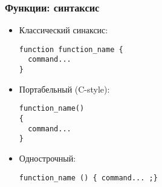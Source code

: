 \begin{frame}[fragile]
	\frametitle{Функции: синтаксис}
	\begin{itemize}
		\item Классический синаксис: 
			\begin{lstlisting}
function function_name {
  command...
}
\end{lstlisting}
		\item Портабельный (C-style):
			\begin{lstlisting}
function_name()
{
  command...
} 
\end{lstlisting}

		\item Однострочный:
			\begin{lstlisting}
function_name () { command... ;}
\end{lstlisting}
  \end{itemize}
\end{frame}

